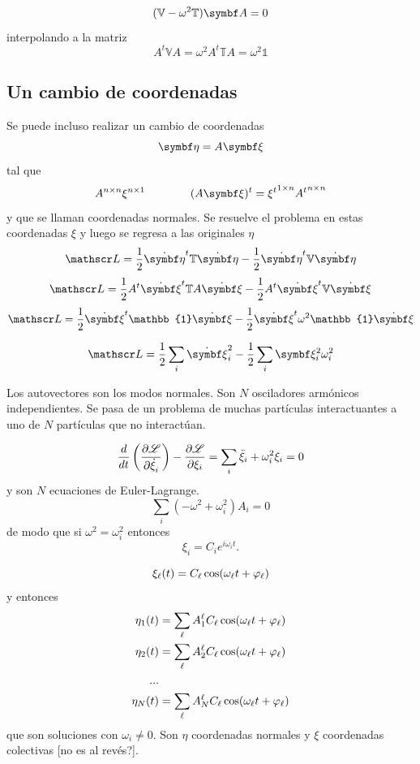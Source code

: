 \documentclass[10pt,oneside]{CBFT_book}
\begin{document}
\[
	(\mathbb{V} - \omega^2 \mathbb{T})\vb{A} = 0
\]
interpolando a la matriz 
\[
	A^t \mathbb{V} A = \omega^2 A^t \mathbb{T} A= \omega^2 \mathbb{1}
\]

\subsection{Un cambio de coordenadas}

Se puede incluso realizar un cambio de coordenadas
\[
	\vb{\eta} = A \vb{\xi}
\]
tal que 
\[
	A^{n\times n} \xi^{n\times 1} \qquad \qquad  (A \vb{\xi} )^t = {\xi^t}^{1 \times n} {A^t}^{n \times n}
\]
y que se llaman coordenadas normales. Se resuelve el problema en estas coordenadas $\xi$ y luego se regresa a las
originales $\eta$
\[
	\Lag = \frac{1}{2} \dot{\vb{\eta}}^t \mathbb{T} \dot{\vb{\eta}} - \frac{1}{2} \dot{\vb{\eta}}^t \mathbb{V} \dot{\vb{\eta}}
\]
\[
	\Lag = \frac{1}{2} A^t\dot{\vb{\xi}}^t \mathbb{T} A \dot{\vb{\xi}} - \frac{1}{2} A^t\dot{\vb{\xi}}^t \mathbb{V} 
\dot{\vb{\xi}}
\]
\[
	\Lag = \frac{1}{2} \dot{\vb{\xi}}^t \mathbb{1} \dot{\vb{\xi}} - \frac{1}{2} \dot{\vb{\xi}}^t \omega^2 \mathbb{1} \dot{\vb{\xi}}
\]

\[
	\Lag = \frac{1}{2} \sum_i \dot{\vb{\xi}}_i^2 - \frac{1}{2} \sum_i \vb{\xi}_i^2 \omega^2_i 
\]

Los autovectores son los modos normales. Son $N$ osciladores armónicos independientes. Se pasa de un problema de muchas partículas
interactuantes a uno de $N$ partículas que no interactúan.

\[
	\frac{d}{dt}\left( \frac{\partial^{\hspace{-0.05em}} {\mathscr{L}}}{\partial {\dot{\xi}_i}^{\hspace{-0.05em}}} \right)- \frac{\partial^{\hspace{-0.05em}} {\mathscr{L}}}{\partial {\xi_i}^{\hspace{-0.05em}}} = \sum_i \ddot{\xi}_i + \omega^2_i \xi_i = 0 
\]
y son $N$ ecuaciones de Euler-Lagrange.
\[
	\sum_i ( -\omega^2 + \omega^2_i ) A_i = 0
\]
de modo que si $\omega^2 = \omega^2_i$ entonces
\[
	\xi_i = C_i e^{i\omega_i t}.
\]


\[
	\xi_\ell(t) = C_\ell \cos( \omega_\ell t + \varphi_\ell )
\]
y entonces
\begin{align*}
	\eta_1(t) &= \sum_{\ell} A_1^\ell C_\ell \cos( \omega_\ell t + \varphi_\ell ) \\
	\eta_2(t) &= \sum_{\ell} A_2^\ell C_\ell \cos( \omega_\ell t + \varphi_\ell ) \\
	... & \\
	\eta_N(t) &= \sum_{\ell} A_N^\ell C_\ell \cos( \omega_\ell t + \varphi_\ell )
\end{align*}
que son soluciones con $\omega_i \neq 0$. Son $\eta$ coordenadas normales y $\xi$ coordenadas colectivas [no es al revés?].
\end{document}
